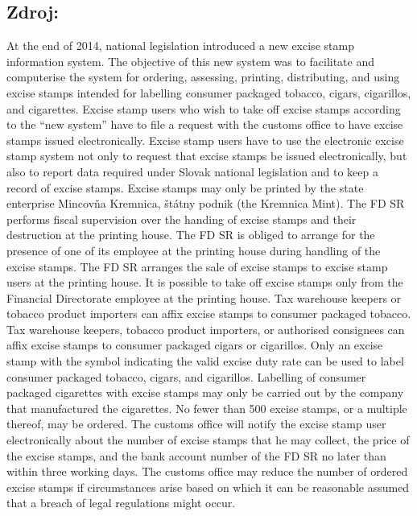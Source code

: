 \documentclass[10pt]{article}
\begin{document}
\subsection*{Zdroj:}

At the end of 2014, national legislation introduced a new excise stamp information system.
The objective of this new system was to facilitate and computerise the system for ordering, assessing, printing, distributing, and using excise stamps intended for labelling consumer packaged tobacco, cigars, cigarillos, and cigarettes.
Excise stamp users who wish to take off excise stamps according to the “new system” have to file a request with the customs office to have excise stamps issued electronically.
Excise stamp users have to use the electronic excise stamp system not only to request that excise stamps be issued electronically, but also to report data required under Slovak national legislation and to keep a record of excise stamps.
Excise stamps may only be printed by the state enterprise Mincovňa Kremnica, štátny podnik (the Kremnica Mint).
The FD SR performs fiscal supervision over the handing of excise stamps and their destruction at the printing house.
The FD SR is obliged to arrange for the presence of one of its employee at the printing house during handling of the excise stamps.
The FD SR arranges the sale of excise stamps to excise stamp users at the printing house.
It is possible to take off excise stamps only from the Financial Directorate employee at the printing house.
Tax warehouse keepers or tobacco product importers can affix excise stamps to consumer packaged tobacco.
Tax warehouse keepers, tobacco product importers, or authorised consignees can affix excise stamps to consumer packaged cigars or cigarillos.
Only an excise stamp with the symbol indicating the valid excise duty rate can be used to label consumer packaged tobacco, cigars, and cigarillos.
Labelling of consumer packaged cigarettes with excise stamps may only be carried out by the company that manufactured the cigarettes.
No fewer than 500 excise stamps, or a multiple thereof, may be ordered.
The customs office will notify the excise stamp user electronically about the number of excise stamps that he may collect, the price of the excise stamps, and the bank account number of the FD SR no later than within three working days.
The customs office may reduce the number of ordered excise stamps if circumstances arise based on which it can be reasonable assumed that a breach of legal regulations might occur.


\pagebreak
\end{document}
